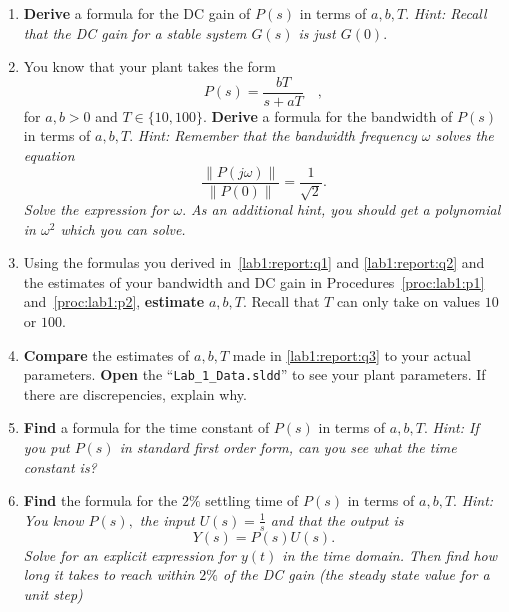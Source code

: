 \begin{deliverable}[label={lab1:report}]
  \begin{enumerate}[label={(\arabic*)}]
    \item{
      \label{lab1:report:q1}
      \textbf{Derive} a formula for the DC gain of \(P(s)\) in terms of
      \(a, b, T.\)
      \emph{Hint: Recall that the DC gain for a stable system \(G(s)\)
      is just \(G(0).\)}
    }
    \item{
      \label{lab1:report:q2}
      You know that your plant takes the form
      \[
        P(s) = \frac{b T}{s + a T}\quad ,
      \]
      for \(a, b > 0\) and \(T \in \{10, 100\}.\) \textbf{Derive} a
      formula for the bandwidth of \(P(s)\) in terms of \(a, b, T.\)
      \emph{Hint: Remember that the bandwidth frequency \(\omega\) solves
      the equation}
      \[
        \frac{\left\|P(j \omega)\right\|}{\left\|P(0)\right\|}
        =
        \frac{1}{\sqrt{2}}.
      \]
      \emph{Solve the expression for \(\omega.\) As
      an additional hint, you should get a polynomial in \(\omega^2\) which
      you can solve.}
    }
    \item{
      \label{lab1:report:q3}
      Using the formulas you derived in~\ref{lab1:report:q1} and
      \ref{lab1:report:q2} and the estimates of your bandwidth and DC gain
      in Procedures~\ref{proc:lab1:p1} and~\ref{proc:lab1:p2},
      \textbf{estimate} \(a, b, T.\) Recall that \(T\) can only take on
      values \(10\) or \(100.\)
    }
    \item{
      \label{lab1:report:q4}
      \textbf{Compare} the estimates of \(a, b, T\) made in
      \ref{lab1:report:q3} to your actual parameters.
      \textbf{Open} the ``\texttt{Lab\_1\_Data.sldd}'' to see your plant
      parameters. If there are discrepencies, explain why.
    }
    \item{
      \label{lab1:report:q5}
      \textbf{Find} a formula for the time constant of \(P(s)\) in terms of
      \(a, b, T.\) \emph{Hint: If you put \(P(s)\) in standard first order
      form, can you see what the time constant is?}
    }
    \item{
      \label{lab1:report:q6}
      \textbf{Find} the formula for the \(2\%\) settling time of \(P(s)\) in terms of \(a, b, T.\)
      \emph{Hint: You know \(P(s),\) the input \(U(s) = \frac{1}{s}\) and that
      the output is}
      \[
        Y(s) = P(s) U(s).
      \]
      \emph{Solve for an explicit expression for \(y(t)\) in the time domain.
      Then find how long it takes to reach within \(2\%\) of the DC gain (the steady state value for a unit step)}
}
\end{enumerate}
\end{deliverable}
